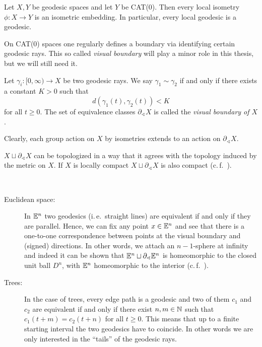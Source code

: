 \begin{prop}
  Let \(X,Y\) be geodesic spaces and let \(Y\) be CAT(0). Then every local isometry \(\phi \colon X \to Y\) is an isometric embedding. In particular, every local geodesic is a geodesic.
\end{prop}

On CAT(0) spaces one regularly defines a boundary via identifying certain geodesic rays. This so called \emph{visual boundary} will play a minor role in this thesis, but we will still need it. 

\begin{defin}
  \label{defin:visual}
  Let \(\gamma_i \colon [0, \infty) \to X\) be two geodesic rays. We say \(\gamma_1 \sim \gamma_2\) if and only if there exists a constant \(K > 0 \) such that
  \[
    d(\gamma_1(t), \gamma_2(t)) < K
  \]
  for all \(t \geq 0\). The set of equivalence classes \(\partial_\sphericalangle X\) is called the \emph{visual boundary of \(X\)}.

  Clearly, each group action on \(X\) by isometries extends to an action on \(\partial_\sphericalangle X\).
\end{defin}

\begin{rem}
  \(X \sqcup \partial_{\sphericalangle}X\) can be topologized in a way that it agrees with the topology induced by the metric on \(X\). If \(X\) is locally compact \(X \sqcup \partial_\sphericalangle X\) is also compact (c.\,f.~\cite[Sec.~II.8]{MR1744486}).
\end{rem}

\begin{bsp}~
  \begin{description}
  \item[Euclidean space:] In \(\mathbb{E}^n\) two geodesics (i.\,e.\ straight lines) are equivalent if and only if they are parallel. Hence, we can fix any point \(x \in \mathbb{E}^n\) and see that there is a one-to-one correspondence between points at the visual boundary and (signed) directions. In other words, we attach an \(n-1\)-sphere at infinity and indeed it can be shown that \(\mathbb{E}^n \sqcup \partial_\sphericalangle \mathbb{E}^n\) is homeomorphic to the closed unit ball \(D^n\), with \(\mathbb{E}^n\) homeomorphic to the interior (c.\,f.~\cite[Section~II.8]{MR1744486}).
  \item[Trees:] In the case of trees, every edge path is a geodesic and two of them \(c_1\) and \(c_2\) are equivalent if and only if there exist \(n,m \in \mathbb{N}\) such that \(c_1(t+m) = c_2(t+n)\) for all \(t\geq0\). This means that up to a finite starting interval the two geodesics have to coincide. In other words we are only interested in the \enquote{tails} of the geodesic rays.
  \end{description}
\end{bsp}

